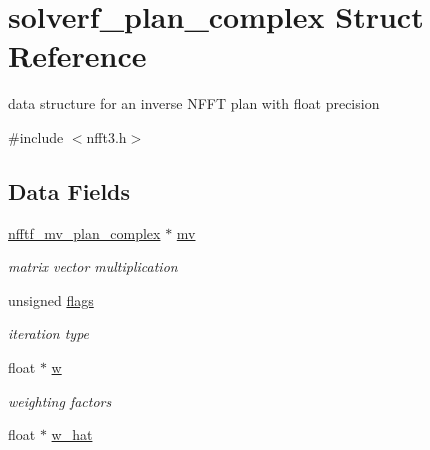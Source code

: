 \hypertarget{structsolverf__plan__complex}{\section{solverf\-\_\-plan\-\_\-complex Struct Reference}
\label{structsolverf__plan__complex}
}


data structure for an inverse N\-F\-F\-T plan with float precision  




{\ttfamily \#include $<$nfft3.\-h$>$}

\subsection*{Data Fields}
\begin{DoxyCompactItemize}
\item 
\hypertarget{structsolverf__plan__complex_a519286afbd99d020738a92e03c320a18}{\hyperlink{structnfftf__mv__plan__complex}{nfftf\-\_\-mv\-\_\-plan\-\_\-complex} $\ast$ \hyperlink{structsolverf__plan__complex_a519286afbd99d020738a92e03c320a18}{mv}}\label{structsolverf__plan__complex_a519286afbd99d020738a92e03c320a18}

\begin{DoxyCompactList}\small\item\em matrix vector multiplication \end{DoxyCompactList}\item 
\hypertarget{structsolverf__plan__complex_a2d7642432b4b627a4bf77d1c05216669}{unsigned \hyperlink{structsolverf__plan__complex_a2d7642432b4b627a4bf77d1c05216669}{flags}}\label{structsolverf__plan__complex_a2d7642432b4b627a4bf77d1c05216669}

\begin{DoxyCompactList}\small\item\em iteration type \end{DoxyCompactList}\item 
\hypertarget{structsolverf__plan__complex_a91f7e03dc8509952827333cc61ca9aa4}{float $\ast$ \hyperlink{structsolverf__plan__complex_a91f7e03dc8509952827333cc61ca9aa4}{w}}\label{structsolverf__plan__complex_a91f7e03dc8509952827333cc61ca9aa4}

\begin{DoxyCompactList}\small\item\em weighting factors \end{DoxyCompactList}\item 
\hypertarget{structsolverf__plan__complex_aece5ec597b25ea28c945d2559316fad8}{float $\ast$ \hyperlink{structsolverf__plan__complex_aece5ec597b25ea28c945d2559316fad8}{w\-\_\-hat}}\label{structsolverf__plan__complex_aece5ec597b25ea28c945d2559316fad8}


\end{DoxyCompactItemize}
